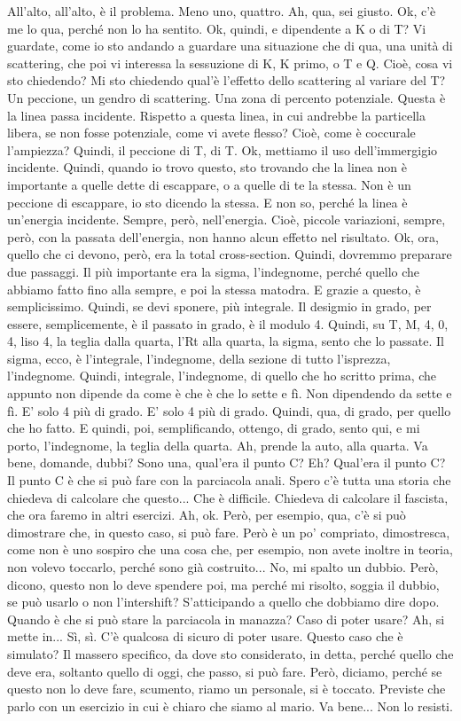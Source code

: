 \begin{soluzione}
{   All'alto, all'alto, è il problema. Meno uno, quattro. Ah, qua, sei giusto. Ok, c'è me lo qua, perché non lo ha sentito. Ok, quindi, e dipendente a K o di T? Vi guardate, come io sto andando a guardare una situazione che di qua, una unità di scattering, che poi vi interessa la sessuzione di K, K primo, o T e Q. Cioè, cosa vi sto chiedendo? Mi sto chiedendo qual'è l'effetto dello scattering al variare del T? Un peccione, un gendro di scattering. Una zona di percento potenziale. Questa è la linea passa incidente. Rispetto a questa linea, in cui andrebbe la particella libera, se non fosse potenziale, come vi avete flesso? Cioè, come è coccurale l'ampiezza? Quindi, il peccione di T, di T. Ok, mettiamo il uso dell'immergigio incidente. Quindi, quando io trovo questo, sto trovando che la linea non è importante a quelle dette di escappare, o a quelle di te la stessa. Non è un peccione di escappare, io sto dicendo la stessa. E non so, perché la linea è un'energia incidente. Sempre, però, nell'energia. Cioè, piccole variazioni, sempre, però, con la passata dell'energia, non hanno alcun effetto nel risultato. Ok, ora, quello che ci devono, però, era la total cross-section. Quindi, dovremmo preparare due passaggi. Il più importante era la sigma, l'indegnome, perché quello che abbiamo fatto fino alla sempre, e poi la stessa matodra. E grazie a questo, è semplicissimo. Quindi, se devi sponere, più integrale. Il desigmio in grado, per essere, semplicemente, è il passato in grado, è il modulo 4. Quindi, su T, M, 4, 0, 4, liso 4, la teglia dalla quarta, l'Rt alla quarta, la sigma, sento che lo passate. Il sigma, ecco, è l'integrale, l'indegnome, della sezione di tutto l'isprezza, l'indegnome. Quindi, integrale, l'indegnome, di quello che ho scritto prima, che appunto non dipende da come è che è che lo sette e fì. Non dipendendo da sette e fì. E' solo 4 più di grado. E' solo 4 più di grado. Quindi, qua, di grado, per quello che ho fatto. E quindi, poi, semplificando, ottengo, di grado, sento qui, e mi porto, l'indegnome, la teglia della quarta. Ah, prende la auto, alla quarta. Va bene, domande, dubbi? Sono una, qual'era il punto C? Eh? Qual'era il punto C? Il punto C è che si può fare con la parciacola anali. Spero c'è tutta una storia che chiedeva di calcolare che questo... Che è difficile. Chiedeva di calcolare il fascista, che ora faremo in altri esercizi. Ah, ok. Però, per esempio, qua, c'è si può dimostrare che, in questo caso, si può fare. Però è un po' compriato, dimostresca, come non è uno sospiro che una cosa che, per esempio, non avete inoltre in teoria, non volevo toccarlo, perché sono già costruito... No, mi spalto un dubbio. Però, dicono, questo non lo deve spendere poi, ma perché mi risolto, soggia il dubbio, se può usarlo o non l'intershift? S'atticipando a quello che dobbiamo dire dopo. Quando è che si può stare la parciacola in manazza? Caso di poter usare? Ah, si mette in... Sì, sì. C'è qualcosa di sicuro di poter usare. Questo caso che è simulato? Il massero specifico, da dove sto considerato, in detta, perché quello che deve era, soltanto quello di oggi, che passo, si può fare. Però, diciamo, perché se questo non lo deve fare, scumento, riamo un personale, si è toccato. Previste che parlo con un esercizio in cui è chiaro che siamo al mario. Va bene... Non lo resisti.
}
\end{soluzione}

